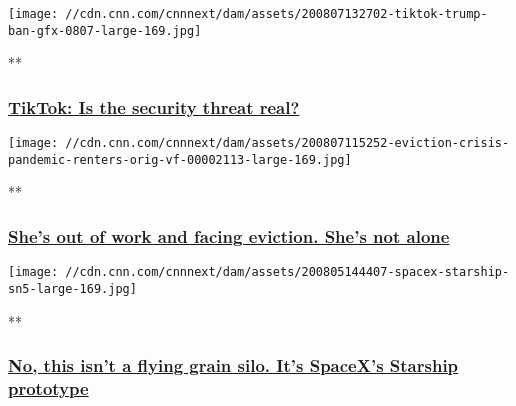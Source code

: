 \href{/videos/business/2020/08/07/tiktok-national-security-orig.cnn-business/video/playlists/business-news/}{}

\texttt{[image: //cdn.cnn.com/cnnnext/dam/assets/200807132702-tiktok-trump-ban-gfx-0807-large-169.jpg]}

**

\hypertarget{tiktok-is-the-security-threat-real}{%
\subsubsection{\texorpdfstring{\href{/videos/business/2020/08/07/tiktok-national-security-orig.cnn-business/video/playlists/business-news/}{TikTok:
Is the security threat
real?}}{TikTok: Is the security threat real?}}\label{tiktok-is-the-security-threat-real}}

\href{/videos/economy/2020/08/07/eviction-crisis-pandemic-renters-orig-vf.cnn/video/playlists/business-news/}{}

\texttt{[image: //cdn.cnn.com/cnnnext/dam/assets/200807115252-eviction-crisis-pandemic-renters-orig-vf-00002113-large-169.jpg]}

**

\hypertarget{shes-out-of-work-and-facing-eviction-shes-not-alone}{%
\subsubsection{\texorpdfstring{\href{/videos/economy/2020/08/07/eviction-crisis-pandemic-renters-orig-vf.cnn/video/playlists/business-news/}{She's
out of work and facing eviction. She's not
alone}}{She's out of work and facing eviction. She's not alone}}\label{shes-out-of-work-and-facing-eviction-shes-not-alone}}

\href{/videos/business/2020/08/05/spacex-starship-elon-musk-hop-test-sn5-orig.cnn-business/video/playlists/business-news/}{}

\texttt{[image: //cdn.cnn.com/cnnnext/dam/assets/200805144407-spacex-starship-sn5-large-169.jpg]}

**

\hypertarget{no-this-isnt-a-flying-grain-silo-its-spacexs-starship-prototype}{%
\subsubsection{\texorpdfstring{\href{/videos/business/2020/08/05/spacex-starship-elon-musk-hop-test-sn5-orig.cnn-business/video/playlists/business-news/}{No,
this isn't a flying grain silo. It's SpaceX's Starship
prototype}}{No, this isn't a flying grain silo. It's SpaceX's Starship prototype}}\label{no-this-isnt-a-flying-grain-silo-its-spacexs-starship-prototype}}

